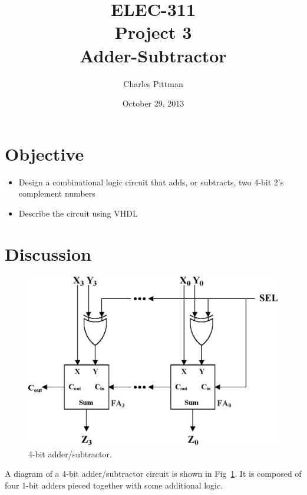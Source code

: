 \documentclass{article}
\author{Charles Pittman}
\title{ELEC-311\\ Project 3\\ Adder-Subtractor}
\date{October 29, 2013}
\begin{document}
\maketitle %

\pagebreak


\section{Objective}
\label{sec:objective}

\begin{itemize}
\item Design a combinational logic circuit that adds, or subtracts, two 4-bit 2's complement numbers
\item Describe the circuit using VHDL
\end{itemize}

\section{Discussion}
\label{sec:procedure}

\begin{figure}[hbtp]
  \centering
  \includegraphics[width=\textwidth]{adder}
  \caption{\label{fig:adder} 4-bit adder/subtractor.}
\end{figure}

A diagram of a 4-bit adder/subtractor circuit is shown in Fig~\ref{fig:adder}.  It is composed of four 1-bit adders pieced together with some additional logic.
\end{document}
